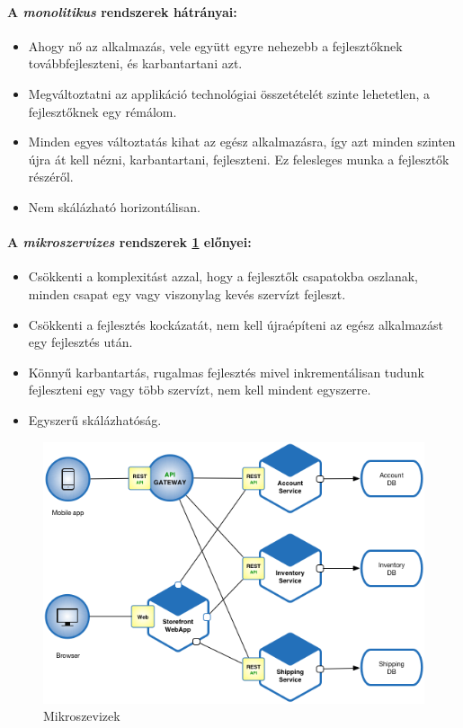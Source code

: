 \paragraph{A \emph{monolitikus} rendszerek hátrányai:}
\begin{itemize}
    \item Ahogy nő az alkalmazás, vele együtt egyre nehezebb a fejlesztőknek továbbfejleszteni, és karbantartani azt.
    \item Megváltoztatni az applikáció technológiai összetételét szinte lehetetlen, a fejlesztőknek egy rémálom.
    \item Minden egyes változtatás kihat az egész alkalmazásra, így azt minden szinten újra át kell nézni, karbantartani, fejleszteni. Ez felesleges munka a fejlesztők részéről.
    \item Nem skálázható horizontálisan.
\end{itemize}

\paragraph{A \emph{mikroszervizes} rendszerek \ref{fig:micro} előnyei: }
\begin{itemize}
    \item Csökkenti a komplexitást azzal, hogy a fejlesztők csapatokba oszlanak, minden csapat egy vagy viszonylag kevés szervízt fejleszt.
    \item Csökkenti a fejlesztés kockázatát, nem kell újraépíteni az egész alkalmazást egy fejlesztés után.
    \item Könnyű karbantartás, rugalmas fejlesztés mivel inkrementálisan tudunk fejleszteni egy vagy több szervízt, nem kell mindent egyszerre.
    \item Egyszerű skálázhatóság.
\end{itemize}

\begin{figure}
    \centering
    \includegraphics[scale=0.6]{images/microservices.png}
    \caption{Mikroszevizek \cite{microservices.io}}
    \label{fig:micro}
\end{figure}

